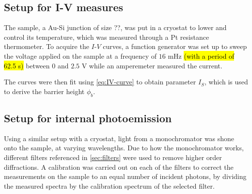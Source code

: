 \subsection{Setup for I-V measures}
The sample, a Au-Si junction of size ??, was put in a cryostat to lower and control its temperature, which was measured through a Pt resistance thermometer.
To acquire the $I$-$V$ curves, a function generator was set up to sweep the voltage applied on the sample at a frequency of $16$ mHz \hl{(with a period of 62.5 s)} between $0$ and $2.5$ V while an amperemeter measured the current. 

The curves were then fit using \autoref{eq:IV-curve} to obtain parameter $I_S$, which is used to derive the barrier height $\phi_b$.

\subsection{Setup for internal photoemission}
Using a similar setup with a cryostat, light from a monochromator was shone onto the sample, at varying wavelengths. Due to how the monochromator works, different filters referenced in \autoref{sec:filters} were used to remove higher order diffractions. A calibration was carried out on each of the filters to correct the measurements on the sample to an equal number of incident photons, by dividing the measured spectra by the calibration spectrum of the selected filter.
